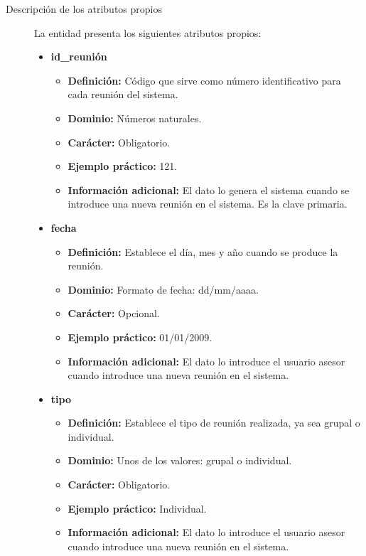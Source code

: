 \begin{description}
   \item[Descripción de los atributos propios] La entidad presenta los siguientes
   atributos propios:

   \begin{itemize}
    \item \textbf{id\_reunión}
      \begin{itemize}
         \item \textbf{Definición:} Código que sirve como número identificativo
               para cada reunión del sistema.
         \item \textbf{Dominio:} Números naturales.
         \item \textbf{Carácter:} Obligatorio.
         \item \textbf{Ejemplo práctico:} 121.
         \item \textbf{Información adicional:} El dato lo genera el sistema
               cuando se introduce una nueva reunión en el sistema. Es la clave
               primaria.
      \end{itemize}
    \item \textbf{fecha}
      \begin{itemize}
        \item \textbf{Definición:} Establece el día, mes y año cuando se
        produce la reunión.
        \item \textbf{Dominio:} Formato de fecha: dd/mm/aaaa.
        \item \textbf{Carácter:} Opcional.
        \item \textbf{Ejemplo práctico:} 01/01/2009.
        \item \textbf{Información adicional:} El dato lo introduce el
        usuario asesor cuando introduce una nueva reunión en el sistema.
      \end{itemize}
    \item \textbf{tipo}
      \begin{itemize}
        \item \textbf{Definición:} Establece el tipo de reunión realizada,
        ya sea grupal o individual.
        \item \textbf{Dominio:} Unos de los valores: grupal o individual.
        \item \textbf{Carácter:} Obligatorio.
        \item \textbf{Ejemplo práctico:} Individual.
        \item \textbf{Información adicional:} El dato lo introduce el
         usuario asesor cuando introduce una nueva reunión en el sistema.

\end{itemize}
\end{itemize}
\end{description}
